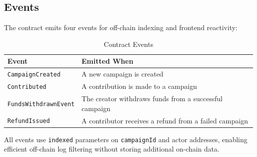 \subsection{Events}

The contract emits four events for off-chain indexing and frontend reactivity:

\begin{table}[H]
\centering
\caption{Contract Events}
\label{tab:events}
\begin{tabularx}{\textwidth}{l X}
\toprule
\textbf{Event} & \textbf{Emitted When} \\
\midrule
\texttt{CampaignCreated}      & A new campaign is created \\
\texttt{Contributed}           & A contribution is made to a campaign \\
\texttt{FundsWithdrawnEvent}   & The creator withdraws funds from a successful campaign \\
\texttt{RefundIssued}          & A contributor receives a refund from a failed campaign \\
\bottomrule
\end{tabularx}
\end{table}

All events use \texttt{indexed} parameters on \texttt{campaignId} and actor addresses, enabling efficient off-chain log filtering without storing additional on-chain data.

